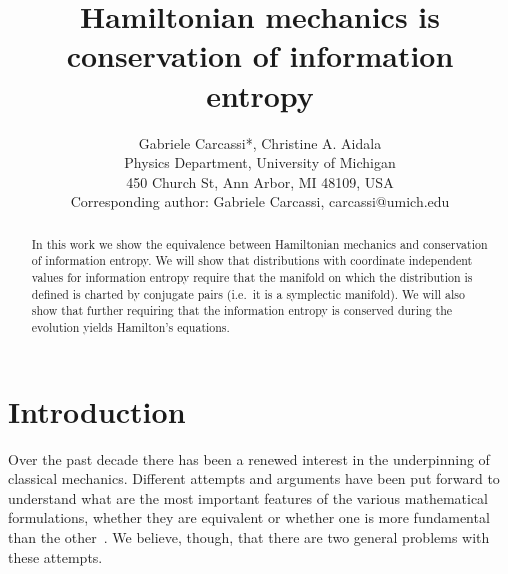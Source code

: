 \documentclass[11pt]{elsarticle}
\begin{document}
\title{Hamiltonian mechanics is conservation of information entropy}
\author{Gabriele Carcassi*, Christine A. Aidala \\ Physics Department, University of Michigan \\ 450 Church St, Ann Arbor, MI 48109, USA \\
	Corresponding author: Gabriele Carcassi, carcassi@umich.edu}


\begin{abstract}
	In this work we show the equivalence between Hamiltonian mechanics and conservation of information entropy. We will show that distributions with coordinate independent values for information entropy require that the manifold on which the distribution is defined is charted by conjugate pairs (i.e.~it is a symplectic manifold). We will also show that further requiring that the information entropy is conserved during the evolution yields Hamilton's equations.
\end{abstract}
\maketitle

\tableofcontents
\newpage

\section{Introduction}

Over the past decade there has been a renewed interest in the underpinning of classical mechanics. Different attempts and arguments have been put forward to understand what are the most important features of the various mathematical formulations, whether they are equivalent or whether one is more fundamental than the other~\cite{North,Curiel,Barrett1,Barrett2}. We believe, though, that there are two general problems with these attempts.
\end{document}

